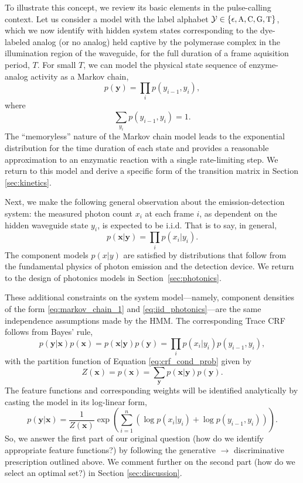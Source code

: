 \documentclass[10pt]{article}
\newcommand{\tcrf}{Trace {\small CRF}}
\newcommand{\hmm}{{\small HMM}}
\newcommand{\fA}{\ensuremath{\text{\small{A}}}}
\newcommand{\fC}{\ensuremath{\text{\small{C}}}}
\newcommand{\fG}{\ensuremath{\text{\small{G}}}}
\newcommand{\fT}{\ensuremath{\text{\small{T}}}}
\begin{document}
To illustrate this concept, we review its basic elements in the pulse-calling context.  Let us consider a model with the label alphabet $\mathcal{Y} \in \{\epsilon, \fA, \fC, \fG, \fT\}$, which we now identify with hidden system states corresponding to the dye-labeled analog (or no analog) held captive by the polymerase complex in the illumination region of the waveguide, for the full duration of a frame aquisition period, $T$.
For small $T$, we can model the physical state sequence of enzyme-analog activity as a Markov chain,
\begin{equation}
\label{eq:markov_chain_1}
 p(\mathbf{y}) = \prod_i{p(y_{i-1}, y_i)},
\end{equation}
where
\begin{equation}
\sum_{y_i} p(y_{i-1}, y_i) = 1.
\end{equation}
The ``memoryless'' nature of the Markov chain model leads to the exponential distribution for the time duration of each state and provides a reasonable approximation to an enzymatic reaction with a single rate-limiting step. We return to this model and derive a specific form of the transition matrix in Section \ref{sec:kinetics}.

Next, we make the following general observation about the emission-detection system:
the measured photon count $x_i$ at each frame $i$, as dependent on the hidden waveguide state $y_i$, is expected to be i.i.d.
That is to say, in general,
\begin{equation}
\label{eq:iid_photonics}
p(\mathbf{x}|\mathbf{y}) = \prod_i p(x_i|y_i).
\end{equation}
The component models $p(x|y)$ are satisfied by distributions that follow from the fundamental physics of photon emission and the detection device.  We return to the design of photonics models in Section~\ref{sec:photonics}.

These additional constraints on the system model---namely, component densities of the form \eqref{eq:markov_chain_1} and \eqref{eq:iid_photonics}---are the same independence assumptions made by the \hmm.
The corresponding \tcrf{} follows from Bayes' rule,
\begin{equation}
\label{eq:bayes}
p(\mathbf{y}|\mathbf{x}) p(\mathbf{x}) = p(\mathbf{x}|\mathbf{y}) p(\mathbf{y}) = \prod_i p(x_i|y_i) p(y_{i-1}, y_i),
\end{equation}
with the partition function of Equation \eqref{eq:crf_cond_prob} given by 
\begin{equation}
Z(\mathbf{x}) = p(\mathbf{x}) = \sum_{\mathbf{y}} p(\mathbf{x}|\mathbf{y}) p(\mathbf{y}).
\end{equation}
The feature functions and corresponding weights will be identified analytically by casting the model in its log-linear form,
\begin{equation}
p(\mathbf{y}|\mathbf{x}) = \frac{1}{Z(\mathbf{x})} \exp(\sum_{i=1}^n (\log p(x_i|y_i) + \log p(y_{i-1}, y_i))).
\end{equation}
So, we answer the first part of our original question (how do we identify appropriate feature functions?) by following the generative $\rightarrow$ discriminative prescription outlined above.  We comment further on the second part (how do we select an optimal set?) in Section \ref{sec:discussion}. 
\end{document}
